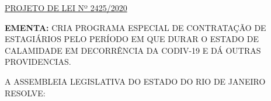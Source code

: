 \documentclass[10pt]{article}
\date{}
\begin{document}
\maketitle
\begin{center}
  \huge
  \vspace{-3cm}\href{http://alerjln1.alerj.rj.gov.br/scpro1923.nsf/f4b46b3cdbba990083256cc900746cf6/e468d6c07dc6dbc603258554005eb245?OpenDocument}{PROJETO DE LEI Nº 2425/2020}
\bigskip
\bigskip
\bigskip
  
\end{center}

\textbf{EMENTA:} 
CRIA PROGRAMA ESPECIAL DE CONTRATAÇÃO DE ESTAGIÁRIOS PELO PERÍODO EM QUE DURAR O ESTADO DE CALAMIDADE EM DECORRÊNCIA DA CODIV-19 E DÁ OUTRAS PROVIDENCIAS.    








\bigskip

\noindent
A ASSEMBLEIA LEGISLATIVA DO ESTADO DO RIO DE JANEIRO RESOLVE:
\end{document}
